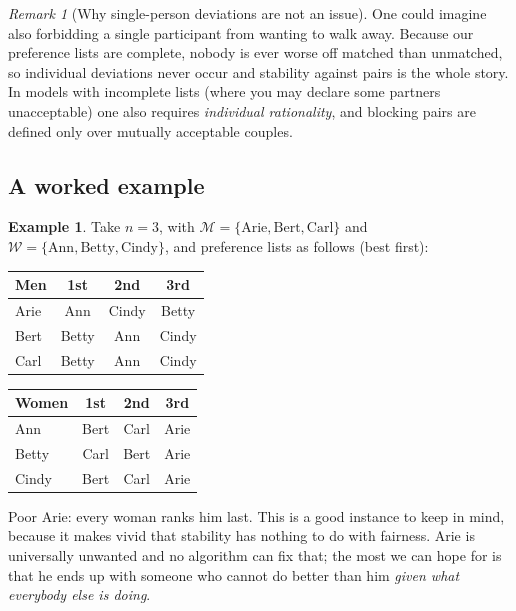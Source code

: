 \documentclass[11pt,a4paper]{article}
\theoremstyle{plain}
\theoremstyle{definition}
\newtheorem{example}[theorem]{Example}
\theoremstyle{remark}
\newtheorem{remark}[theorem]{Remark}
\newcommand{\Men}{\mathcal{M}}
\newcommand{\Women}{\mathcal{W}}
\begin{document}
\begin{remark}[Why single-person deviations are not an issue]
One could imagine also forbidding a single participant from wanting to walk
away. Because our preference lists are complete, nobody is ever worse off
matched than unmatched, so individual deviations never occur and stability
against pairs is the whole story. In models with incomplete lists (where you
may declare some partners unacceptable) one also requires
\emph{individual rationality}, and blocking pairs are defined only over
mutually acceptable couples.
\end{remark}

\subsection{A worked example}\label{sec:example}

\begin{example}\label{ex:main}
Take $n=3$, with $\Men = \{\text{Arie},\text{Bert},\text{Carl}\}$ and
$\Women = \{\text{Ann},\text{Betty},\text{Cindy}\}$, and preference lists as
follows (best first):

\begin{center}
\begin{tabular}{@{}lccc@{}}
\toprule
\textbf{Men} & 1st & 2nd & 3rd \\
\midrule
Arie  & Ann   & Cindy & Betty \\
Bert  & Betty & Ann   & Cindy \\
Carl  & Betty & Ann   & Cindy \\
\bottomrule
\end{tabular}
\hspace{2em}
\begin{tabular}{@{}lccc@{}}
\toprule
\textbf{Women} & 1st & 2nd & 3rd \\
\midrule
Ann   & Bert & Carl & Arie \\
Betty & Carl & Bert & Arie \\
Cindy & Bert & Carl & Arie \\
\bottomrule
\end{tabular}
\end{center}
\end{example}

Poor Arie: every woman ranks him last. This is a good instance to keep in mind,
because it makes vivid that stability has nothing to do with fairness. Arie is
universally unwanted and no algorithm can fix that; the most we can hope for
is that he ends up with someone who cannot do better than him \emph{given
what everybody else is doing}.
\end{document}

